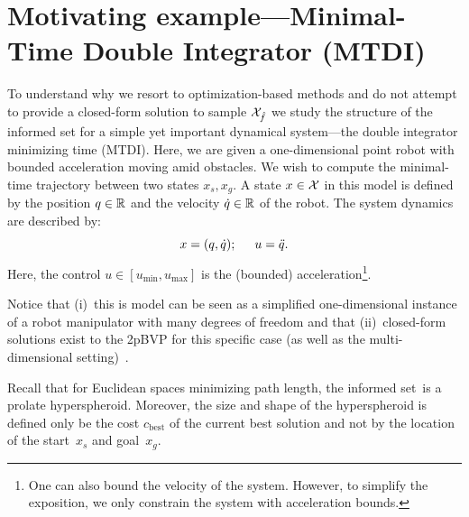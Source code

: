 \documentclass[letterpaper, 10 pt, conference]{ieeeconf}  %
\begin{document}
\section{Motivating example---Minimal-Time Double Integrator (MTDI)}
\label{sec:mtdi}

To understand why we resort to optimization-based methods and do not attempt to provide a closed-form solution to sample $\mathcal{X}_{\hat{f}}$ we study the structure of the informed set for a simple yet important dynamical system---the double integrator minimizing time (MTDI). 
Here, we are given a one-dimensional point robot with bounded acceleration moving amid obstacles. We wish to compute the minimal-time trajectory between two states $x_s, x_g$.
A state $x \in \mathcal{X}$ in this model is defined by 
the position $q \in \mathbb{R}$
and
the velocity $\dot{q}\in \mathbb{R}$ of the robot.
The system dynamics are described by:
\begin{equation}
x = (q, \dot{q}); 
\hspace{5mm}
u = \ddot{q}.
\end{equation}
Here, the control $u \in [u_{\text{min}}, u_{\text{max}}]$ is the (bounded) acceleration\footnote{One can also bound the velocity of the system. However, to simplify the exposition, we only constrain the system with acceleration bounds.}. 


Notice that 
(i)~this is model can be seen as a simplified one-dimensional instance of a robot manipulator with many degrees of freedom and that
(ii)~closed-form solutions exist to the 2pBVP for this specific case (as well as the multi-dimensional setting)~\cite{HN10, KS14}.

%
%
Recall that for Euclidean spaces minimizing path length, the informed set~\Cinf is a prolate hyperspheroid.
Moreover, the size and shape of the hyperspheroid is defined only be the cost $c_{\text{best}}$ of the current best solution and not by the location of the start~$x_s$ and goal~$x_g$.
\end{document}
